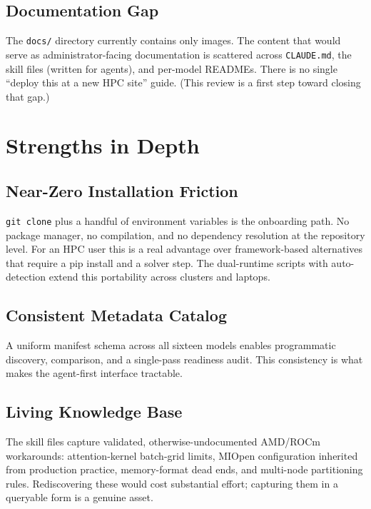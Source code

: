 \documentclass[11pt]{article}
\newcommand{\code}[1]{\texttt{#1}}
\newcommand{\file}[1]{\texttt{\small #1}}
\begin{document}
\subsection{Documentation Gap}
The \file{docs/} directory currently contains only images. The content that would serve
as administrator-facing documentation is scattered across \file{CLAUDE.md}, the skill
files (written for agents), and per-model READMEs. There is no single
``deploy this at a new HPC site'' guide. (This review is a first step toward closing
that gap.)

\section{Strengths in Depth}
\label{sec:strengths}

\subsection{Near-Zero Installation Friction}
\code{git clone} plus a handful of environment variables is the onboarding path. No
package manager, no compilation, and no dependency resolution at the repository level.
For an HPC user this is a real advantage over framework-based alternatives that require
a pip install and a solver step. The dual-runtime scripts with auto-detection extend
this portability across clusters and laptops.

\subsection{Consistent Metadata Catalog}
A uniform manifest schema across all sixteen models enables programmatic discovery,
comparison, and a single-pass readiness audit. This consistency is what makes the
agent-first interface tractable.

\subsection{Living Knowledge Base}
The skill files capture validated, otherwise-undocumented AMD/ROCm workarounds:
attention-kernel batch-grid limits, MIOpen configuration inherited from production
practice, memory-format dead ends, and multi-node partitioning rules. Rediscovering
these would cost substantial effort; capturing them in a queryable form is a genuine
asset.
\end{document}
